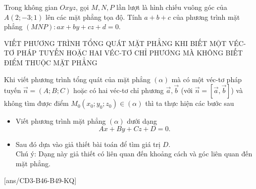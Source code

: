 \begin{ex}%
	Trong không gian $Oxyz$, gọi $M, N, P$ lần lượt là hình chiếu vuông góc của $A(2 ;-3 ; 1)$ lên các mặt phẳng tọa độ. Tính $a+b+c$ của phương trình mặt phẳng $(MNP)\colon ax+by+cz+d=0$. 
\end{ex}
\begin{dang}{VIẾT PHƯƠNG TRÌNH TỔNG QUÁT MẶT PHẲNG KHI BIẾT MỘT VÉC-TƠ PHÁP TUYẾN HOẶC HAI VÉC-TƠ CHỈ PHƯƠNG MÀ KHÔNG BIẾT ĐIỂM THUỘC MẶT PHẲNG}
\end{dang}
\begin{tomtat}
	Khi viết phương trình tổng quát của mặt phẳng $(\alpha)$ mà có một véc-tơ pháp tuyến $\overrightarrow{n}=(A ; B ; C)$ hoặc có hai véc-tơ chỉ phương $\overrightarrow{a}, \overrightarrow{b}$ (với $\overrightarrow{n}=\left[\overrightarrow{a}, \overrightarrow{b}\right]$) và không tìm được điểm $M_0\left(x_0 ; y_0 ; z_0\right) \in(\alpha)$ thì ta thực hiện các bước sau
	\begin{itemize}
		\item Viết phương trình mặt phẳng $(\alpha)$ dưới dạng
		$$
		Ax+By+Cz+D=0
		.$$
		\item Sau đó dựa vào giả thiết bài toán để tìm giá trị $D$.\\
		Chú ý: Dạng này giả thiết có liên quan đến khoảng cách và góc liên quan đến mặt phẳng.
	\end{itemize}
\end{tomtat}
[ans/CD3-B46-B49-KQ]
\TN
